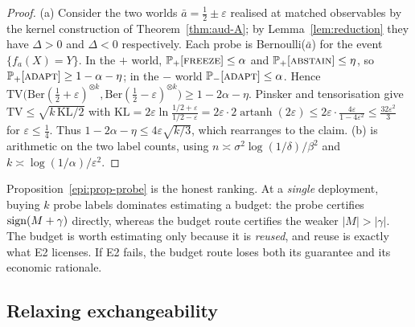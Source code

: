 \begin{proof}
(a) Consider the two worlds $\bar a=\tfrac12\pm\varepsilon$ realised at matched observables by the
kernel construction of Theorem~\ref{thm:aud-A}; by Lemma~\ref{lem:reduction} they have
$\Delta>0$ and $\Delta<0$ respectively. Each probe is Bernoulli($\bar a$) for the event
$\{f_a(X)=Y\}$. In the $+$ world, $\Pr_+[\textsc{freeze}]\le\alpha$ and
$\Pr_+[\textsc{abstain}]\le\eta$, so $\Pr_+[\textsc{adapt}]\ge1-\alpha-\eta$; in the $-$ world
$\Pr_-[\textsc{adapt}]\le\alpha$. Hence
$\mathrm{TV}\bigl(\mathrm{Ber}(\tfrac12+\varepsilon)^{\otimes k},
\mathrm{Ber}(\tfrac12-\varepsilon)^{\otimes k}\bigr)\ge1-2\alpha-\eta$. Pinsker and tensorisation
give $\mathrm{TV}\le\sqrt{k\,\mathrm{KL}/2}$ with
$\mathrm{KL}=2\varepsilon\ln\frac{1/2+\varepsilon}{1/2-\varepsilon}
=2\varepsilon\cdot2\operatorname{artanh}(2\varepsilon)\le
2\varepsilon\cdot\frac{4\varepsilon}{1-4\varepsilon^2}\le\frac{32\varepsilon^2}{3}$
for $\varepsilon\le\tfrac14$. Thus $1-2\alpha-\eta\le4\varepsilon\sqrt{k/3}$, which rearranges to the
claim. (b) is arithmetic on the two label counts, using
$n\asymp\sigma^2\log(1/\delta)/\beta^2$ and $k\asymp\log(1/\alpha)/\varepsilon^2$.
\end{proof}

\begin{remark}
Proposition~\ref{epi:prop-probe} is the honest ranking. At a \emph{single} deployment, buying
$k$ probe labels dominates estimating a budget: the probe certifies $\sign(M+\gamma)$ directly,
whereas the budget route certifies the weaker $|M|>|\gamma|$. The budget is worth estimating only
because it is \emph{reused}, and reuse is exactly what E2 licenses. If E2 fails, the budget route
loses both its guarantee and its economic rationale.
\end{remark}

\subsection{Relaxing exchangeability}

